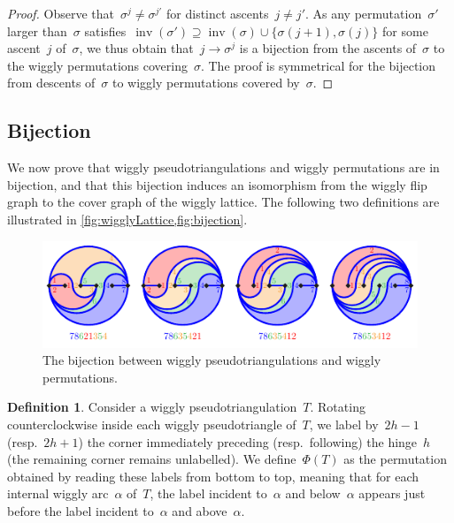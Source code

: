 \documentclass{amsart}
\theoremstyle{definition}
\newtheorem{definition}[theorem]{Definition}
\newcommand{\eqdef}{\mbox{\,\raisebox{0.2ex}{\scriptsize\ensuremath{\mathrm:}}\ensuremath{=}\,}} %
\DeclareMathOperator{\inv}{inv} %
\begin{document}
\begin{proof}
Observe that~$\sigma^j \ne \sigma^{j'}$ for distinct ascents~$j \ne j'$.
As any permutation~$\sigma'$ larger than~$\sigma$ satisfies~${\inv(\sigma') \supseteq \inv(\sigma) \cup \{\sigma(j+1), \sigma(j)\}}$ for some ascent~$j$ of~$\sigma$, we thus obtain that~$j \to \sigma^j$ is a bijection from the ascents of~$\sigma$ to the wiggly permutations covering~$\sigma$.
The proof is symmetrical for the bijection from descents of~$\sigma$ to wiggly permutations covered by~$\sigma$.
\end{proof}


\subsection{Bijection}
\label{subsec:bijection}

\enlargethispage{.3cm}
We now prove that wiggly pseudotriangulations and wiggly permutations are in bijection, and that this bijection induces an isomorphism from the wiggly flip graph to the cover graph of the wiggly lattice.
The following two definitions are illustrated in \cref{fig:wigglyLattice,fig:bijection}.

\begin{figure}
\centerline{\includegraphics[scale=1.7]{bijection}}
\caption{The bijection between wiggly pseudotriangulations and wiggly permutations.}
\label{fig:bijection}
\end{figure}


\begin{definition}
\label{def:bijection1}
Consider a wiggly pseudotriangulation~$T$.
Rotating counterclockwise inside each wiggly pseudotriangle of~$T$, we label by~$2h-1$ (resp.~$2h+1$) the corner immediately preceding (resp.~following) the hinge~$h$ (the remaining corner remains unlabelled).
We define~$\Phi(T)$ as the permutation obtained by reading these labels from bottom to top, meaning that for each internal wiggly arc~$\alpha$ of~$T$, the label incident to~$\alpha$ and below~$\alpha$ appears just before the label incident to~$\alpha$ and above~$\alpha$.
\end{definition}
\end{document}
